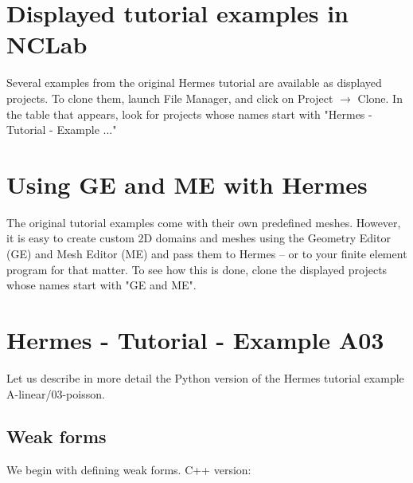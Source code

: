 \documentclass{article}
\begin{document}
\section*{Displayed tutorial examples in NCLab}

Several examples from the original Hermes tutorial are
available as displayed projects. To clone them, launch
File Manager, and click on Project $\rightarrow$ Clone.
In the table that appears, look for projects whose names 
start with "Hermes - Tutorial - Example ..."

\section*{Using GE and ME with Hermes}

The original tutorial examples come with their own predefined meshes. 
However, it is easy to create custom 2D domains and meshes using the Geometry Editor (GE)
and Mesh Editor (ME) and pass them to Hermes -- or to your finite element 
program for that matter. To see how this is done, 
clone the displayed projects whose names start with "GE and ME". 

\section*{Hermes - Tutorial - Example A03}

Let us describe in more detail the Python version 
of the Hermes tutorial example A-linear/03-poisson. 

\subsection*{Weak forms}

We begin with defining weak forms. C++ version:
\end{document}
